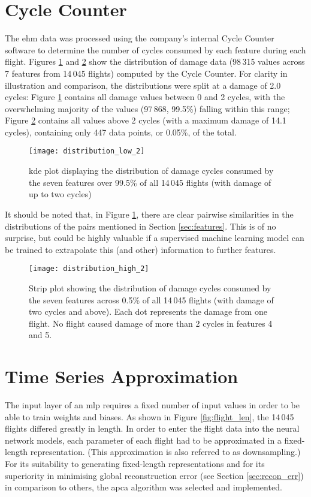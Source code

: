 \section{Cycle Counter} \label{sec:cyclecounter}
The \ac{ehm} data was processed using the company's internal Cycle Counter software to determine the number of cycles consumed by each feature during each flight. Figures \ref{fig:dmg_dist_low} and \ref{fig:dmg_dist_high} show the distribution of damage data (98\,315 values across 7 features from 14\,045 flights) computed by the Cycle Counter. For clarity in illustration and comparison, the distributions were split at a damage of 2.0 cycles: Figure \ref{fig:dmg_dist_low} contains all damage values between 0 and 2 cycles, with the overwhelming majority of the values (97\,868, 99.5\%) falling within this range; Figure \ref{fig:dmg_dist_high} contains all values above 2 cycles (with a maximum damage of 14.1 cycles), containing only 447 data points, or 0.05\%, of the total.

\begin{figure}
    \centering
    \texttt{[image: distribution\_low\_2]}
    \caption{\label{fig:dmg_dist_low} \ac{kde} plot displaying the distribution of damage cycles consumed by the seven features over 99.5\% of all 14\,045 flights (with damage of up to two cycles)}
\end{figure}

It should be noted that, in Figure \ref{fig:dmg_dist_low}, there are clear pairwise similarities in the distributions of the pairs mentioned in Section \ref{sec:features}. This is of no surprise, but could be highly valuable if a supervised machine learning model can be trained to extrapolate this (and other) information to further features.

\begin{figure}
    \centering
    \texttt{[image: distribution\_high\_2]}
    \caption{\label{fig:dmg_dist_high} Strip plot showing the distribution of damage cycles consumed by the seven features across 0.5\% of all 14\,045 flights (with damage of two cycles and above). Each dot represents the damage from one flight. No flight caused damage of more than 2 cycles in features 4 and 5.}
\end{figure}

\section{Time Series Approximation} \label{sec:downsample}
The input layer of an \ac{mlp} requires a fixed number of input values in order to be able to train weights and biases. As shown in Figure \ref{fig:flight_len}, the 14\,045 flights differed greatly in length. In order to enter the flight data into the neural network models, each parameter of each flight had to be approximated in a fixed-length representation. (This approximation is also referred to as downsampling.) For its suitability to generating fixed-length representations and for its superiority in minimising global reconstruction error (see Section \ref{sec:recon_err}) in comparison to others, the \ac{apca} algorithm \cite[]{keogh_locally_2002} was selected and implemented.

